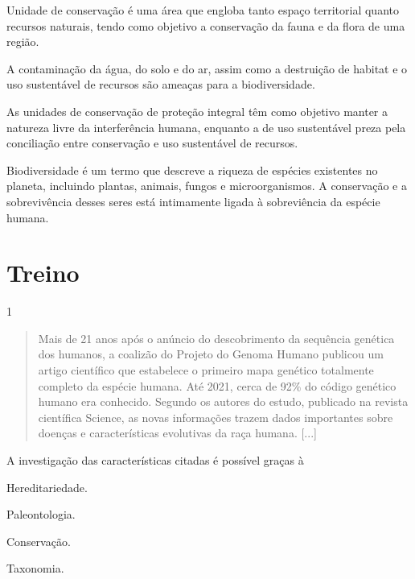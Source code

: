 \begin{boxlist}
 Unidade de conservação é uma área que engloba tanto espaço
territorial quanto recursos naturais, tendo como objetivo a conservação
da fauna e da flora de uma região.

 A contaminação da água, do solo e do ar, assim como a destruição de
habitat e o uso sustentável de recursos são ameaças para a
biodiversidade. 

 As unidades de conservação de proteção integral têm como objetivo
manter a natureza livre da interferência humana, enquanto a de uso
sustentável preza pela conciliação entre conservação e uso sustentável
de recursos.

 Biodiversidade é um termo que descreve a riqueza de espécies
existentes no planeta, incluindo plantas, animais, fungos e
microorganismos. A conservação e a sobrevivência desses seres está
intimamente ligada à sobreviência da espécie humana.
\end{boxlist}


\section*{Treino}

\num{1}

\begin{quote}
Mais de 21 anos após o anúncio do descobrimento da sequência genética
  dos humanos, a coalizão do Projeto do Genoma Humano publicou um artigo
  científico que estabelece o primeiro mapa genético totalmente completo
  da espécie humana. 
  Até 2021, cerca de 92\% do código genético humano
  era conhecido. Segundo os autores do estudo, publicado na revista
  científica Science, as novas informações trazem dados importantes
  sobre doenças e características evolutivas da raça humana. [...]

\end{quote}

A investigação das características citadas é possível graças à

\begin{escolha}
\item
  Hereditariedade.
\item
  Paleontologia.
\item
  Conservação.
\item
  Taxonomia.
\end{escolha}


